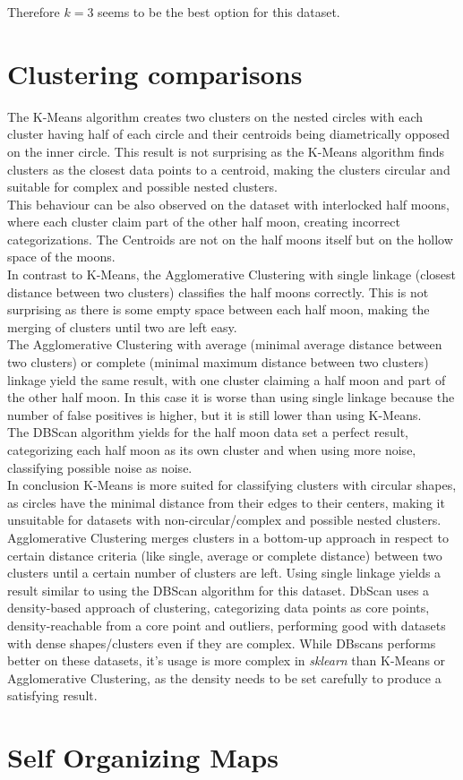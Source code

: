 \documentclass[a4paper, 11pt]{article}
\begin{document}
Therefore $k=3$ seems to be the best option for this dataset.
\section{Clustering comparisons}
The K-Means algorithm creates two clusters on the nested circles with each cluster having half of each circle and their centroids being diametrically opposed on the inner circle. This result is not surprising as the K-Means algorithm finds clusters as the closest data points to a centroid, making the clusters circular and suitable for complex and possible nested clusters.\\
This behaviour can be also observed on the dataset with interlocked half moons, where each cluster claim part of the other half moon, creating incorrect categorizations. The Centroids are not on the half moons itself but on the hollow space of the moons.\\
In contrast to K-Means, the Agglomerative Clustering with single linkage (closest distance between two clusters) classifies the half moons correctly. This is not surprising as there is some empty space between each half moon, making the merging of clusters until two are left easy.\\
The Agglomerative Clustering with average (minimal average distance between two clusters) or complete (minimal maximum distance between two clusters) linkage yield the same result, with one cluster claiming a half moon and part of the other half moon. In this case it is worse than using single linkage because the number of false positives is higher, but it is still lower than using K-Means.\\
The DBScan algorithm yields for the half moon data set a perfect result, categorizing each half moon as its own cluster and when using more noise, classifying possible noise as noise.\\
In conclusion K-Means is more suited for classifying clusters with circular shapes, as circles have the minimal distance from their edges to their centers, making it unsuitable for datasets with non-circular/complex and possible nested clusters. Agglomerative Clustering merges clusters in a bottom-up approach in respect to certain distance criteria (like single, average or complete distance) between two clusters until a certain number of clusters are left. Using single linkage yields a result similar to using the DBScan algorithm for this dataset.
DbScan uses a density-based approach of clustering, categorizing data points as core points, density-reachable from a core point and outliers, performing good with datasets with dense shapes/clusters even if they are complex. While DBscans performs better on these datasets, it's usage is more complex in \textit{sklearn} than K-Means or Agglomerative Clustering, as the density needs to be set carefully to produce a satisfying result.
\section{Self Organizing Maps}
\end{document}

